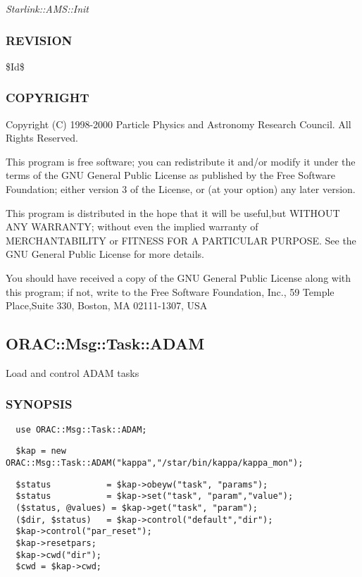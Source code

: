 \begin{description}
\begin{description}
\emph{Starlink::AMS::Init}

\subsubsection*{REVISION\label{ORAC::Msg::Control::AMS_REVISION}}


\$Id\$

\subsubsection*{COPYRIGHT\label{ORAC::Msg::Control::AMS_COPYRIGHT}}


Copyright (C) 1998-2000 Particle Physics and Astronomy Research
Council. All Rights Reserved.



This program is free software; you can redistribute it and/or modify it under
the terms of the GNU General Public License as published by the Free Software
Foundation; either version 3 of the License, or (at your option) any later
version.



This program is distributed in the hope that it will be useful,but WITHOUT ANY
WARRANTY; without even the implied warranty of MERCHANTABILITY or FITNESS FOR A
PARTICULAR PURPOSE. See the GNU General Public License for more details.



You should have received a copy of the GNU General Public License along with
this program; if not, write to the Free Software Foundation, Inc., 59 Temple
Place,Suite 330, Boston, MA  02111-1307, USA

\subsection{ORAC::Msg::Task::ADAM\label{ORAC::Msg::Task::ADAM}}


Load and control ADAM tasks

\subsubsection*{SYNOPSIS\label{ORAC::Msg::Task::ADAM_SYNOPSIS}}
\begin{verbatim}
  use ORAC::Msg::Task::ADAM;
\end{verbatim}
\begin{verbatim}
  $kap = new ORAC::Msg::Task::ADAM("kappa","/star/bin/kappa/kappa_mon");
\end{verbatim}
\begin{verbatim}
  $status           = $kap->obeyw("task", "params");
  $status           = $kap->set("task", "param","value");
  ($status, @values) = $kap->get("task", "param");
  ($dir, $status)   = $kap->control("default","dir");
  $kap->control("par_reset");
  $kap->resetpars;
  $kap->cwd("dir");
  $cwd = $kap->cwd;
\end{verbatim}

\end{description}
\end{description}
